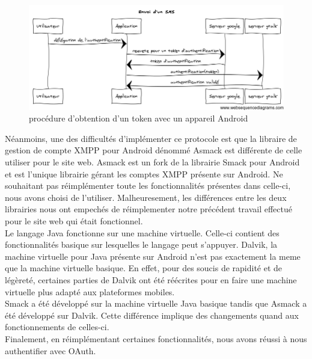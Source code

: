 

\begin{figure}[!h]
	\center
	\includegraphics[width=15cm]{img/obtention-token-avec-android.png}
	\caption{procédure d'obtention d'un token avec un appareil Android}
\end{figure}

Néanmoins, une des difficultés d'implémenter ce protocole est que la libraire de gestion de compte
XMPP pour Android dénommé Asmack est différente de celle utiliser pour le site web. Asmack est un fork 
de la librairie Smack pour Android et est l'unique librairie gérant les comptes XMPP présente sur
Android. Ne souhaitant pas réimplémenter toute les fonctionnalités présentes dans celle-ci, nous avons
choisi de l'utiliser. Malheuresement, les différences entre les deux librairies nous ont empechés de 
réimplementer notre précédent travail effectué pour le site web qui était fonctionnel. 
\\
Le langage Java fonctionne sur une machine virtuelle. Celle-ci contient des fonctionnalités basique sur
lesquelles le langage peut s'appuyer. Dalvik, la machine virtuelle pour Java présente sur Android n'est 
pas exactement la meme que la machine virtuelle basique. En effet, pour des soucis de rapidité et de 
légèreté, certaines parties de Dalvik ont été réécrites pour en faire une machine virtuelle plus adapté
aux plateformes mobiles.
\\
Smack a été développé sur la machine virtuelle Java basique tandis que Asmack a été développé sur Dalvik.
Cette différence implique des changements quand aux fonctionnements de celles-ci. 
\\
Finalement, en réimplémentant certaines fonctionnalités, nous avons réussi à nous authentifier avec OAuth.
\\\\

